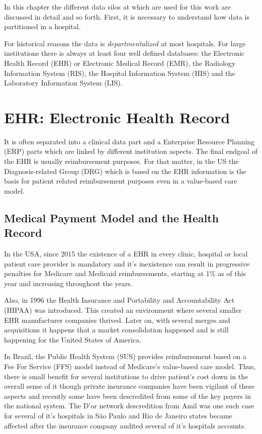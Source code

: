 \label{chap:methodology}

In this chapter the different data silos at \nomeHsl{} which are used for this work are discussed in detail and so forth. First, it is necessary to understand how data is partitioned in a hospital. 

For historical reasons the data is \emph{departmentalized} at most hospitals. For large institutions there is always at least four well defined databases: the Electronic Health Record (EHR) or Electronic Medical Record (EMR), the Radiology Information System (RIS), the Hospital Information System (HIS) and the Laboratory Information System (LIS).

\section{EHR: Electronic Health Record}
\label{sec:ehr}

It is often separated into a clinical data part and a Enterprise Resource Planning (ERP) parts which are linked by different institution aspects. The final endgoal of the EHR is usually reimbursement purposes. For that matter, in the US the Diagnosis-related Group (DRG) which is based on the EHR information is the basis for patient related reimbursement purposes even in a value-based care model.

\subsection{Medical Payment Model and the Health Record}
\label{sec:ehr_payment}
In the USA, since 2015 the existence of a EHR in every clinic, hospital or local patient care provider is mandatory and it's inexistence can result in progressive penalties for Medicare and Medicaid reimbursements, starting at 1\% as of this year and increasing throughout the years.

Also, in 1996 the Health Insurance and Portability and Accountability Act (HIPAA) was introduced\cite{annasHipaa2003}. This created an environment where several smaller EHR manufacturer companies thrived. Later on, with several merges and acquisitions it happens that a market consolidation happened and is still happening for the United States of America.

In Brazil, the Public Health System (SUS) provides reimbursement based on a Fee For Service (FFS) model instead of Medicare's value-based care model. Thus, there is small benefit for several institutions to drive patient's cost down in the overall sense of it though private insurance companies have been vigilant of these aspects and recently some have been descredited from some of the key payers in the national system. The D'or network descredition from Amil was one such case for several of it's hospitals in São Paulo and Rio de Janeiro states became affected after the insurance company audited several of it's hospitals accounts\cite{amilRedeDor2019}.

